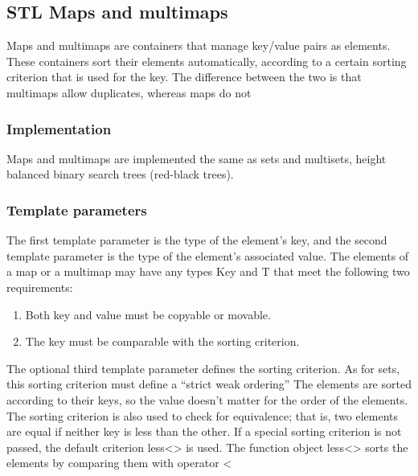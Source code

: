 \documentclass{report}
\begin{document}
   \pagebreak 
   \subsection{STL Maps and multimaps}
   \bigbreak \noindent 
   Maps and multimaps are containers that manage key/value pairs as elements. These containers sort
   their elements automatically, according to a certain sorting criterion that is used for the key. The
   difference between the two is that multimaps allow duplicates, whereas maps do not
   \bigbreak \noindent 
   \subsubsection{Implementation}
   \bigbreak \noindent \bigbreak \noindent 
   Maps and multimaps are implemented the same as sets and multisets, height balanced binary search trees (red-black trees).

   \bigbreak \noindent 
   \subsubsection{Template parameters}
   \bigbreak \noindent \bigbreak \noindent 
   The first template parameter is the type of the element’s key, and the second template parameter is
the type of the element’s associated value. The elements of a map or a multimap may have any types
Key and T that meet the following two requirements:
\begin{enumerate}
    \item Both key and value must be copyable or movable.
    \item The key must be comparable with the sorting criterion.
\end{enumerate}
\bigbreak \noindent 
The optional third template parameter defines the sorting criterion. As for sets, this sorting criterion must define a “strict weak ordering” The elements are sorted according to their keys, so the value doesn’t matter for the order of the elements. The sorting criterion is also used to check for equivalence; that is, two elements are equal if neither key is less than the other.
\bigbreak \noindent 
If a special sorting criterion is not passed, the default criterion less<> is used. The function object
less<> sorts the elements by comparing them with operator <
\bigbreak \noindent 
\end{document}
